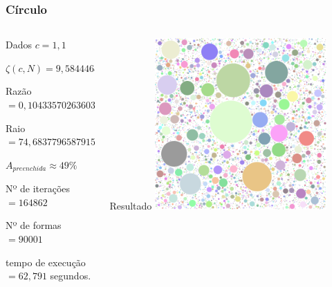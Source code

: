 \documentclass[aspectratio=169]{beamer}
\begin{document}
\begin{frame}
\frametitle{Círculo}

\begin{columns}[T]
\begin{column}{.5\textwidth}
\begin{block}{\centering Dados}
$c=1,1$
\smallskip

$\zeta(c,N)=9,584446883809193$
\smallskip

Razão $=0,10433570263603623$
\smallskip

Raio $=74,68377965879155$
\smallskip

$A_{preenchida} \approx 49\%$
\smallskip

Nº de iterações $=164862$
\smallskip

Nº de formas $=90001$
\smallskip

tempo de execução $= 62,791$ segundos.
\smallskip
\end{block}
\end{column}

\begin{column}{.5\textwidth}
\begin{block}{\centering Resultado}
\centering
\includegraphics[width=0.7\textwidth]{exemplo4}
\end{block}
\end{column}
\end{columns}
\end{frame}
\end{document}
